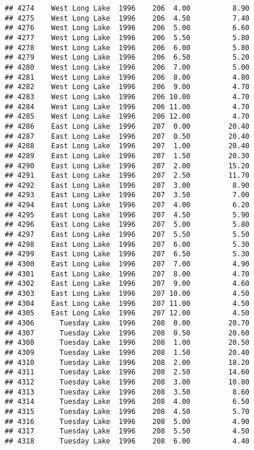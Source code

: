 \documentclass[
]{article}
\begin{document}
\begin{verbatim}
## 4274    West Long Lake  1996    206  4.00          8.90
## 4275    West Long Lake  1996    206  4.50          7.40
## 4276    West Long Lake  1996    206  5.00          6.60
## 4277    West Long Lake  1996    206  5.50          5.80
## 4278    West Long Lake  1996    206  6.00          5.80
## 4279    West Long Lake  1996    206  6.50          5.20
## 4280    West Long Lake  1996    206  7.00          5.00
## 4281    West Long Lake  1996    206  8.00          4.80
## 4282    West Long Lake  1996    206  9.00          4.70
## 4283    West Long Lake  1996    206 10.00          4.70
## 4284    West Long Lake  1996    206 11.00          4.70
## 4285    West Long Lake  1996    206 12.00          4.70
## 4286    East Long Lake  1996    207  0.00         20.40
## 4287    East Long Lake  1996    207  0.50         20.40
## 4288    East Long Lake  1996    207  1.00         20.40
## 4289    East Long Lake  1996    207  1.50         20.30
## 4290    East Long Lake  1996    207  2.00         15.20
## 4291    East Long Lake  1996    207  2.50         11.70
## 4292    East Long Lake  1996    207  3.00          8.90
## 4293    East Long Lake  1996    207  3.50          7.00
## 4294    East Long Lake  1996    207  4.00          6.20
## 4295    East Long Lake  1996    207  4.50          5.90
## 4296    East Long Lake  1996    207  5.00          5.80
## 4297    East Long Lake  1996    207  5.50          5.50
## 4298    East Long Lake  1996    207  6.00          5.30
## 4299    East Long Lake  1996    207  6.50          5.30
## 4300    East Long Lake  1996    207  7.00          4.90
## 4301    East Long Lake  1996    207  8.00          4.70
## 4302    East Long Lake  1996    207  9.00          4.60
## 4303    East Long Lake  1996    207 10.00          4.50
## 4304    East Long Lake  1996    207 11.00          4.50
## 4305    East Long Lake  1996    207 12.00          4.50
## 4306      Tuesday Lake  1996    208  0.00         20.70
## 4307      Tuesday Lake  1996    208  0.50         20.60
## 4308      Tuesday Lake  1996    208  1.00         20.50
## 4309      Tuesday Lake  1996    208  1.50         20.40
## 4310      Tuesday Lake  1996    208  2.00         18.20
## 4311      Tuesday Lake  1996    208  2.50         14.60
## 4312      Tuesday Lake  1996    208  3.00         10.80
## 4313      Tuesday Lake  1996    208  3.50          8.60
## 4314      Tuesday Lake  1996    208  4.00          6.50
## 4315      Tuesday Lake  1996    208  4.50          5.70
## 4316      Tuesday Lake  1996    208  5.00          4.90
## 4317      Tuesday Lake  1996    208  5.50          4.50
## 4318      Tuesday Lake  1996    208  6.00          4.40

\end{verbatim}
\end{document}
